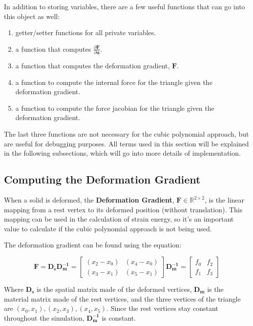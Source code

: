 \documentclass[twocolumn,10pt]{asme2ej}
\begin{document}
In addition to storing variables, there are a few useful functions that can go into this object as well:
\begin{enumerate}
  \item getter/setter functions for all private variables.
  \item a function that computes $\frac{\partial \bm{F}}{\partial \bm{u}}$.
  \item a function that computes the deformation gradient, $\bm{F}$.
  \item a function to compute the internal force for the triangle given the deformation gradient.
  \item a function to compute the force jacobian for the triangle given the deformation gradient.
\end{enumerate}

The last three functions are not necessary for the cubic polynomial approach, but are useful for debugging purposes.
All terms used in this section will be explained in the following subsections, which will go into more details of
implementation.

\subsection{Computing the Deformation Gradient}

When a solid is deformed, the \textbf{Deformation Gradient}, $\bm{F} \in \mathbb{R}^{2 \times 2}$, is the linear mapping from a rest vertex to its deformed position (without translation). This mapping can be used in the calculation of strain energy, so it's an important value to calculate if the cubic polynomial approach is not being used.

The deformation gradient can be found using the equation:

\begin{equation}
\bm{F} = \bm{D_sD_{m}^{-1}} = \begin{bmatrix} (x_2 - x_0) & (x_4 - x_0) \\ (x_3 - x_1) & (x_5 - x_1) \end{bmatrix} \bm{D_{m}^{-1}} = \begin{bmatrix} f_0 & f_2 \\ f_1 & f_3 \end{bmatrix}
\label{eq_F}
\end{equation}

Where $\bm{D_s}$ is the spatial matrix made of the deformed vertices, $\bm{D_m}$ is the material matrix made of the rest vertices, and the three vertices of the triangle are $(x_0, x_1), (x_2, x_3), (x_4, x_5)$. Since the rest vertices stay constant throughout the simulation, $\bm{D_{m}^{-1}}$ is constant.
\end{document}
